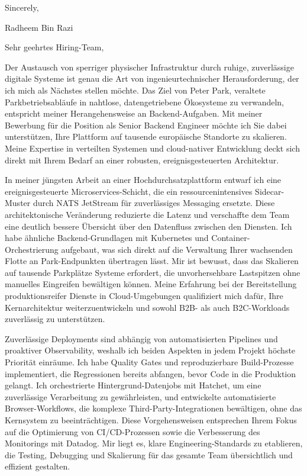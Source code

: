 \documentclass[11pt,a4paper]{coverletter}
\begin{document}
\closing{Sincerely,}{Radheem Bin Razi}

\clearpage
{}


\opening{Sehr geehrtes Hiring-Team,}

Der Austausch von sperriger physischer Infrastruktur durch ruhige, zuverlässige digitale Systeme ist genau die Art von ingenieurtechnischer Herausforderung, der ich mich als Nächstes stellen möchte. Das Ziel von Peter Park, veraltete Parkbetriebsabläufe in nahtlose, datengetriebene Ökosysteme zu verwandeln, entspricht meiner Herangehensweise an Backend-Aufgaben. Mit meiner Bewerbung für die Position als Senior Backend Engineer möchte ich Sie dabei unterstützen, Ihre Plattform auf tausende europäische Standorte zu skalieren. Meine Expertise in verteilten Systemen und cloud-nativer Entwicklung deckt sich direkt mit Ihrem Bedarf an einer robusten, ereignisgesteuerten Architektur.

In meiner jüngsten Arbeit an einer Hochdurchsatzplattform entwarf ich eine ereignisgesteuerte Microservices-Schicht, die ein ressourcenintensives Sidecar-Muster durch NATS JetStream für zuverlässiges Messaging ersetzte. Diese architektonische Veränderung reduzierte die Latenz und verschaffte dem Team eine deutlich bessere Übersicht über den Datenfluss zwischen den Diensten. Ich habe ähnliche Backend-Grundlagen mit Kubernetes und Container-Orchestrierung aufgebaut, was sich direkt auf die Verwaltung Ihrer wachsenden Flotte an Park-Endpunkten übertragen lässt. Mir ist bewusst, dass das Skalieren auf tausende Parkplätze Systeme erfordert, die unvorhersehbare Lastspitzen ohne manuelles Eingreifen bewältigen können. Meine Erfahrung bei der Bereitstellung produktionsreifer Dienste in Cloud-Umgebungen qualifiziert mich dafür, Ihre Kernarchitektur weiterzuentwickeln und sowohl B2B- als auch B2C-Workloads zuverlässig zu unterstützen.

Zuverlässige Deployments sind abhängig von automatisierten Pipelines und proaktiver Observability, weshalb ich beiden Aspekten in jedem Projekt höchste Priorität einräume. Ich habe Quality Gates und reproduzierbare Build-Prozesse implementiert, die Regressionen bereits abfangen, bevor Code in die Produktion gelangt. Ich orchestrierte Hintergrund-Datenjobs mit Hatchet, um eine zuverlässige Verarbeitung zu gewährleisten, und entwickelte automatisierte Browser-Workflows, die komplexe Third-Party-Integrationen bewältigen, ohne das Kernsystem zu beeinträchtigen. Diese Vorgehensweisen entsprechen Ihrem Fokus auf die Optimierung von CI/CD-Prozessen sowie die Verbesserung des Monitorings mit Datadog. Mir liegt es, klare Engineering-Standards zu etablieren, die Testing, Debugging und Skalierung für das gesamte Team übersichtlich und effizient gestalten.
\end{document}
